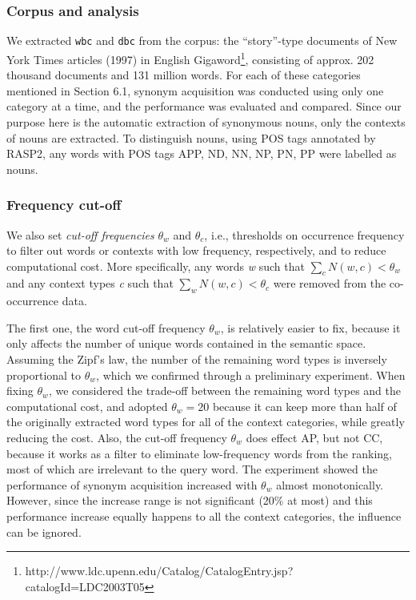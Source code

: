 \documentclass[english]{jnlp_1.4}
\begin{document}
\subsubsection{Corpus and analysis}

We extracted {\tt wbc} and {\tt dbc} from the corpus: the
``story''-type documents of New York Times articles (1997) in English
Gigaword\footnote{http://www.ldc.upenn.edu/Catalog/CatalogEntry.jsp?catalogId=LDC2003T05},
consisting of approx. 202 thousand documents and 131 million
words. For each of these categories mentioned in Section 6.1, synonym
acquisition was conducted using only one category at a time, and the
performance was evaluated and compared. Since our purpose here is the
automatic extraction of synonymous nouns, only the contexts of nouns
are extracted. To distinguish nouns, using POS tags annotated by
RASP2, any words with POS tags APP, ND, NN, NP, PN, PP were labelled as
nouns.

\subsubsection{Frequency cut-off}

We also set {\em cut-off frequencies} $\theta_w$ and $\theta_c$, i.e.,
thresholds on occurrence frequency to filter out words or contexts
with low frequency, respectively, and to reduce computational
cost. More specifically, any words {\it w} such that $\sum_c N(w, c) <
\theta_w$ and any context types {\it c} such that $\sum_w N(w, c) <
\theta_c$ were removed from the co-occurrence data.

The first one, the word cut-off frequency $\theta_w$, is relatively
easier to fix, because it only affects the number of unique words
contained in the semantic space. Assuming the Zipf's law, the number
of the remaining word types is inversely proportional to $\theta_w$,
which we confirmed through a preliminary experiment. When fixing
$\theta_w$, we considered the trade-off between the remaining word
types and the computational cost, and adopted $\theta_w = 20$ because
it can keep more than half of the originally extracted word types for
all of the context categories, while greatly reducing the cost.  Also,
the cut-off frequency $\theta_w$ does effect AP, but not CC, because
it works as a filter to eliminate low-frequency words from the
ranking, most of which are irrelevant to the query word.  The
experiment showed the performance of synonym acquisition increased
with $\theta_w$ almost monotonically. However, since the increase
range is not significant (20\% at most) and this performance increase
equally happens to all the context categories, the influence can be
ignored.
\end{document}

